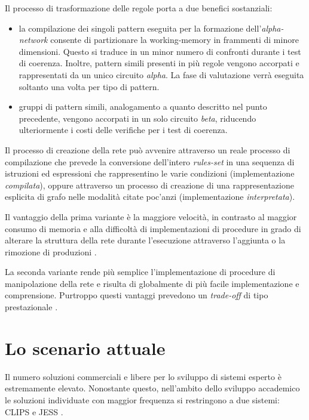 Il processo di trasformazione delle regole porta a due benefici sostanziali:
\begin{itemize}
	\item la compilazione dei singoli pattern eseguita per la formazione dell'\emph{alpha-network} consente di partizionare la working-memory in frammenti di minore dimensioni. Questo si traduce in un minor numero di confronti durante i test di coerenza. Inoltre, pattern simili presenti in più regole vengono accorpati e rappresentati da un unico circuito \emph{alpha}. La fase di valutazione verrà eseguita soltanto una volta per tipo di pattern.
	\item gruppi di pattern simili, analogamento a quanto descritto nel punto precedente, vengono accorpati in un solo circuito \emph{beta}, riducendo ulteriormente i costi delle verifiche per i test di coerenza.
\end{itemize}

Il processo di creazione della rete può avvenire attraverso un reale processo di compilazione \cite{forgy1982} che prevede la conversione dell'intero \emph{rules-set} in una sequenza di istruzioni ed espressioni che rappresentino le varie condizioni (implementazione \emph{compilata}), oppure attraverso un processo di creazione di una rappresentazione esplicita di grafo nelle modalità citate poc'anzi (implementazione \emph{interpretata}). 

Il vantaggio della prima variante è la maggiore velocità, in contrasto al maggior consumo di memoria e alla difficoltà di implementazioni di procedure in grado di alterare la struttura della rete durante l'esecuzione attraverso l'aggiunta o la rimozione di produzioni \cite{Doorenbos95productionmatching}.

La seconda variante rende più semplice l'implementazione di procedure di manipolazione della rete e risulta di globalmente di più facile implementazione e comprensione. Purtroppo questi vantaggi prevedono un \emph{trade-off} di tipo prestazionale \cite{Doorenbos95productionmatching}.

\section{Lo scenario attuale}
Il numero soluzioni commerciali e libere per lo sviluppo di sistemi esperto è estremamente elevato. Nonostante questo, nell'ambito dello sviluppo accademico le soluzioni individuate con maggior frequenza si restringono a due sistemi: CLIPS e JESS \cite{laerhoven1999}.


